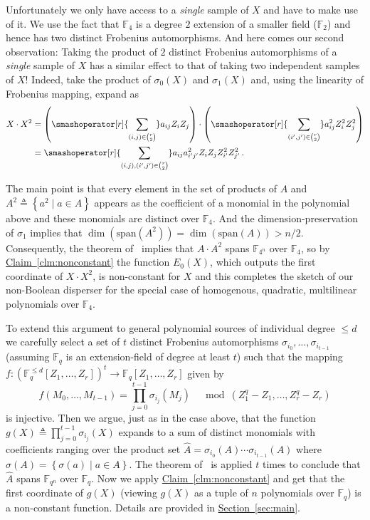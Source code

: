 \documentclass[10pt]{article}
\theoremstyle{definition}
\numberwithin{equation}{section}
\newcommand{\expref}[2]{\texorpdfstring{\hyperref[#2]{#1~\ref{#2}}}{#1~\ref{#2}}}
\newcommand{\set}[1]{\left \{{#1} \right \}}
\newcommand{\spn}{\textrm{span}}
\newcommand{\F}{\mathbb F_q}
\newcommand{\Fn}{\mathbb F_{q^n}}
\newcommand{\Ff}{{\mathbb{F}_{4}}}
\newcommand{\Ffn}{{\mathbb{F}_{4^n}}}
\newcommand{\monom}{\F^{\leq d}[Z_1,\ldots,Z_r]}
\newcommand{\condset}[2]{\set{#1 \mid  #2}}
\begin{document}
Unfortunately we only have access to a \emph{single } sample of $X$ and have to make use of it. We use the fact that $\Ff$ is a degree $2$ extension of a smaller field ($\mathbb{F}_2$) and hence has two distinct Frobenius automorphisms. And here comes our second observation: Taking the product of $2$ distinct Frobenius automorphisms of a \emph{single} sample of $X$ has a similar effect to that of taking two independent samples of $X$! Indeed, take the product of $\sigma_0(X)$ and $\sigma_1(X)$ and, using the linearity of Frobenius mapping, expand as
\begin{align*}
X\cdot X^2 &= \left(\smashoperator[r]{\sum_{(i,j) \in\binom{r}{2}}} a_{ij} Z_i Z_j \right)\cdot\left(\smashoperator[r]{\sum_{(i', j')\in\binom{r}{2}}} a_{ij}^2 Z_i^2 Z_j^2 \right) \\
&= \smashoperator[r]{\sum_{(i,j), (i', j')\in\binom{r}{2}}} a_{ij} a_{i'j'}^2 Z_i Z_j Z_{i'}^2 Z_{j'}^2\,.
\end{align*}

The main point is that every element in the set of products of $A$ and $A^2\triangleq\condset{a^2}{a\in A}$ appears as the coefficient of a monomial in the polynomial above and these monomials are distinct over $\Ff$. And the dimension-preservation of $\sigma_1$ implies that $\dim(\spn(A^2))=\dim(\spn(A))>n/2$. Consequently, the theorem of~\cite{HLX02} implies that $A\cdot A^2$ spans $\Ffn$ over $\Ff$, so by \expref{Claim}{clm:nonconstant} the function $E_0(X)$, which outputs the first coordinate of $X\cdot X^2$, is non-constant for $X$ and this completes the sketch of our non-Boolean disperser for the special case of homogenous, quadratic, multilinear polynomials over $\Ff$.
%
%
%

To extend this argument to general polynomial sources of individual degree $\leq d$ we carefully select a set of $t$ distinct Frobenius automorphisms $\sigma_{i_0},\ldots, \sigma_{i_{t-1}}$ (assuming $\F$ is an extension-field of degree at least $t$) such that the
 mapping $f:(\monom)^t\to \F[Z_1,\ldots,Z_r]$ given by \[f(M_0,\ldots,M_{t-1})=\prod_{j=0}^{t-1} \sigma_{i_j}(M_j)\quad \bmod (Z_1^q-Z_1,\ldots, Z_r^q-Z_r)\]
is injective. Then we argue, just as in the case above, that the function $g(X)\triangleq \prod_{j=0}^{t-1} \sigma_{i_j}(X)$ expands to a sum of distinct monomials with coefficients ranging over the product set $\hat{A}=\sigma_{i_0}(A)\cdots \sigma_{i_{t-1}}(A)$ where $\sigma(A)=\condset{\sigma(a)}{a\in A}$. The theorem of~\cite{HLX02} is applied $t$ times to conclude that $\hat{A}$ spans $\Fn$ over $\F$. Now we apply \expref{Claim}{clm:nonconstant} and get that the first coordinate of $g(X)$ (viewing $g(X)$ as a tuple of $n$ polynomials over $\F$) is a non-constant function. Details are provided in \expref{Section}{sec:main}.
\end{document}
